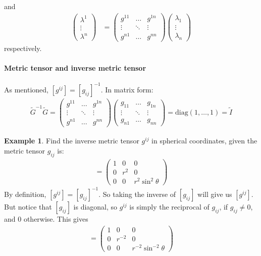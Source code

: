 \documentclass{article}
\theoremstyle{definition}
\newtheorem{exmp}{Example}[section]
\begin{document}
and
\begin{align*}
\begin{pmatrix}
\lambda^1 \\
\vdots\\
\lambda^n
\end{pmatrix}
&=
\begin{pmatrix}
g^{11} & \dots & g^{1n}\\
\vdots & \ddots & \vdots\\
g^{n1} & \dots & g^{nn}
\end{pmatrix}
\begin{pmatrix}
\lambda_1\\
\vdots\\
\lambda_n
\end{pmatrix}
\end{align*}
respectively.\\
\paragraph{Metric tensor and inverse metric tensor\\}
As mentioned, $[g^{ij}] = [g_{ij}]^{-1}$. In matrix form:
\begin{align*}
\boxed{
\tilde{G}^{-1}\tilde{G} = 
\begin{pmatrix}
g^{11} & \dots & g^{1n}\\
\vdots & \ddots & \vdots \\
g^{n1} & \dots & g^{nn}
\end{pmatrix}
\begin{pmatrix}
g_{11} & \dots & g_{1n}\\
\vdots & \ddots & \vdots\\
g_{n1} & \dots & g_{nn}
\end{pmatrix}
=
\text{diag}(1,\dots,1) 
=
\tilde{I}
}
\end{align*}
\begin{exmp}
Find the inverse metric tensor $g^{ij}$ in spherical coordinates, given the metric tensor $g_{ij}$ is:
\begin{align*}
[g_{ij}] = 
\begin{pmatrix}
1 & 0 & 0\\
0 & r^2 & 0\\ 
0 & 0 & r^2\sin^2\theta 
\end{pmatrix}
\end{align*}
By definition, $[g^{ij}] = [g_{ij}]^{-1}$. So taking the inverse of $[g_{ij}]$ will give us $[g^{ij}]$. But notice that $[g_{ij}]$ is diagonal, so $g^{ij}$ is simply the reciprocal of $g_{ij}$, if $g_{ij} \neq 0$, and $0$ otherwise. This gives
\begin{align*}
[g^{ij}] = 
\begin{pmatrix}
1 & 0 & 0 \\
0 & r^{-2} & 0\\
0 & 0 & r^{-2}\sin^{-2}\theta
\end{pmatrix}
\end{align*}
\end{exmp}
\end{document}
